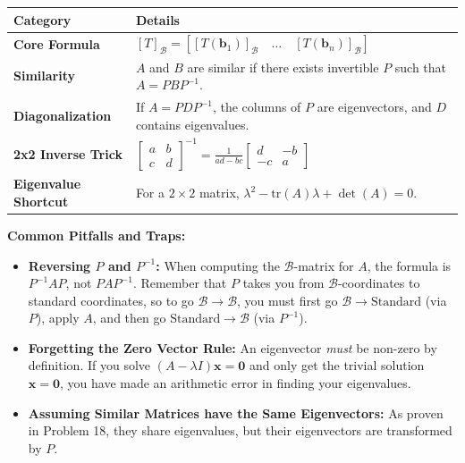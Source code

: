 \documentclass[11pt, a4paper]{article}
\theoremstyle{definition}
\theoremstyle{remark}
\begin{document}
\renewcommand{\arraystretch}{1.5}
\begin{tabularx}{\textwidth}{l X}
\toprule
\textbf{Category} & \textbf{Details} \\
\midrule
\textbf{Core Formula} & $\displaystyle [T]_\mathcal{B} = \left[ [T(\mathbf{b}_1)]_\mathcal{B} \quad \dots \quad [T(\mathbf{b}_n)]_\mathcal{B} \right]$ \\
\addlinespace[4pt]
\textbf{Similarity} & $A$ and $B$ are similar if there exists invertible $P$ such that $A = PBP^{-1}$. \\
\addlinespace[4pt]
\textbf{Diagonalization} & If $A = PDP^{-1}$, the columns of $P$ are eigenvectors, and $D$ contains eigenvalues. \\
\addlinespace[4pt]
\textbf{2x2 Inverse Trick} & $\displaystyle \begin{bmatrix} a & b \\ c & d \end{bmatrix}^{-1} = \frac{1}{ad-bc} \begin{bmatrix} d & -b \\ -c & a \end{bmatrix}$ \\
\addlinespace[4pt]
\textbf{Eigenvalue Shortcut} & For a $2 \times 2$ matrix, $\lambda^2 - \text{tr}(A)\lambda + \det(A) = 0$. \\
\bottomrule
\end{tabularx}

\vspace{1em}
\textbf{Common Pitfalls and Traps:}
\begin{itemize}
    \item \textbf{Reversing $P$ and $P^{-1}$:} When computing the $\mathcal{B}$-matrix for $A$, the formula is $P^{-1}AP$, not $PAP^{-1}$. Remember that $P$ takes you from $\mathcal{B}$-coordinates to standard coordinates, so to go $\mathcal{B} \to \mathcal{B}$, you must first go $\mathcal{B} \to \text{Standard}$ (via $P$), apply $A$, and then go $\text{Standard} \to \mathcal{B}$ (via $P^{-1}$).
    \item \textbf{Forgetting the Zero Vector Rule:} An eigenvector \textit{must} be non-zero by definition. If you solve $(A - \lambda I)\mathbf{x} = \mathbf{0}$ and only get the trivial solution $\mathbf{x} = \mathbf{0}$, you have made an arithmetic error in finding your eigenvalues.
    \item \textbf{Assuming Similar Matrices have the Same Eigenvectors:} As proven in Problem 18, they share eigenvalues, but their eigenvectors are transformed by $P$.
\end{itemize}
\end{document}
